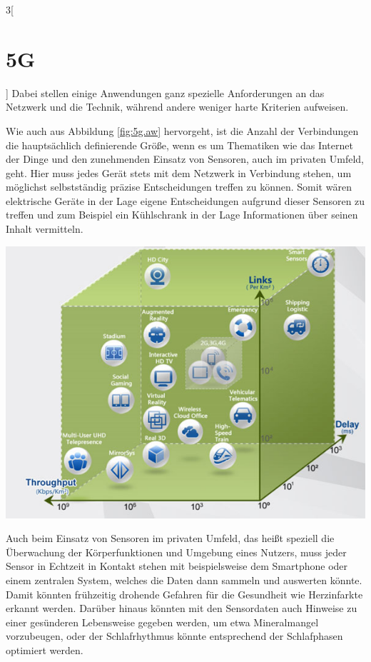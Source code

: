 \begin{multicols}{3}[\section{5G}]
Dabei stellen einige Anwendungen ganz spezielle Anforderungen an das Netzwerk und die Technik, während andere weniger harte Kriterien aufweisen.

Wie auch aus Abbildung \ref{fig:5g.aw} hervorgeht, ist die Anzahl der Verbindungen die hauptsächlich definierende Größe, wenn es um Thematiken wie das Internet der Dinge und den zunehmenden Einsatz von Sensoren, auch im privaten Umfeld, geht.
Hier muss jedes Gerät stets mit dem Netzwerk in Verbindung stehen, um möglichst selbstständig präzise Entscheidungen treffen zu können. Somit wären elektrische Geräte in der Lage eigene Entscheidungen aufgrund dieser Sensoren zu treffen und zum Beispiel ein Kühlschrank in der Lage Informationen über seinen Inhalt vermitteln.

\begin{Figure}
\includegraphics[width=\linewidth]{Kapitel/5G/Grafiken/5g-anwendung}
\label{fig:5g.aw}
\end{Figure}

Auch beim Einsatz von Sensoren im privaten Umfeld, das heißt speziell die Überwachung der Körperfunktionen und Umgebung eines Nutzers, muss jeder Sensor in Echtzeit in Kontakt stehen mit beispielsweise dem Smartphone oder einem zentralen System, welches die Daten dann sammeln und auswerten könnte. Damit könnten frühzeitig drohende Gefahren für die Gesundheit wie Herzinfarkte erkannt werden. Darüber hinaus könnten mit den Sensordaten auch Hinweise zu einer gesünderen Lebensweise gegeben werden, um etwa Mineralmangel vorzubeugen, oder der Schlafrhythmus könnte entsprechend der Schlafphasen optimiert werden.


\end{multicols}
